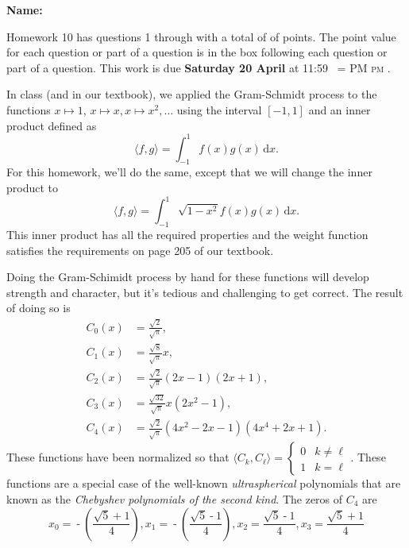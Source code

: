 \documentclass[12pt,fleqn]{exam}
\makeatletter
\newcommand{\quiz}{10}
\newcommand{\term}{Spring}
\DeclareRobustCommand{\maybefakesc}[1]{%
  \ifnum\pdfstrcmp{\f@series}{\bfdefault}=\z@
    {\fontsize{\dimexpr0.8\dimexpr\f@size pt\relax}{0}\selectfont\uppercase{#1}}%
  \else
    \textsc{#1}%
  \fi
}
\newcommand\PM{\,\maybefakesc{pm}\xspace}
\makeatother
\begin{document}
\vspace{0.1in}
\noindent{}
{\bf Name:}  \\
\noindent \makebox[3.0truein][l]{\textbf{Homework \quiz, \term \/ \the\year}}
\vspace{0.1in}

\noindent  Homework 10  has questions 1 through  \numquestions \/ with a total of of  \numpoints\/  points. The point
value for each question or part of a question is in the box following each question or part of a question.
This work is due \textbf{Saturday 20 April  } at 11:59 \PM.  

In class (and in our textbook), we applied the Gram-Schmidt process to the functions $x \mapsto 1$, $x \mapsto x, x \mapsto x^2, \dots$ using the interval $[-1,1]$ and an inner product
defined as 
\begin{equation*}
\langle f,g \rangle = \int_{-1}^1 f(x) g(x) \, \mathrm{d} x.
\end{equation*}
For this homework, we'll do the same, except that we will change the inner product to 
\begin{equation*}
 \langle f,g \rangle = \int_{-1}^1 \sqrt{1-x^2} f(x) g(x) \, \mathrm{d} x.
\end{equation*}
This inner product has all the required properties and the weight function satisfies the requirements on page 205 of our textbook.

Doing the Gram-Schimidt process by hand for these functions will develop strength and  character, but it's tedious and challenging to get correct. The result of doing so is
\begin{align*}
C_0(x) &= \frac{\sqrt{2}}{\sqrt{\uppi}}, \\
C_1(x) &= \frac{\sqrt{8}}{\sqrt{\uppi}} x,\\
C_2(x) &= \frac{\sqrt{2}}{\sqrt{\uppi}} (2x-1)(2x+1), \\
C_3(x) &= \frac{\sqrt{32}}{\sqrt{\uppi}} x(2x^2-1), \\
C_4(x) &= \frac{\sqrt{2}}{\sqrt{\uppi}} (4 x^2 - 2 x - 1)(4x^4+2x+1). 
\end{align*}
These functions have been normalized so that $ \langle C_k, C_\ell  \rangle  = \begin{cases} 0 & k \neq \ell \\ 1 & k=\ell \end{cases}$.  These functions are a special case
of the well-known \emph{ultraspherical} polynomials that are known as the \emph{Chebyshev polynomials of the second kind}. The zeros of $C_4$ are 
\begin{equation*}
x_0 =  \operatorname{-}\left( \frac{\sqrt{5}\operatorname{+}1}{4}\right) ,
x_1 = \operatorname{-}\left( \frac{\sqrt{5}\operatorname{-}1}{4}\right),
x_2 = \frac{\sqrt{5}\operatorname{-}1}{4}\operatorname{,}
x_3 = \frac{\sqrt{5}\operatorname{+}1}{4}
 \end{equation*}
\end{document}
